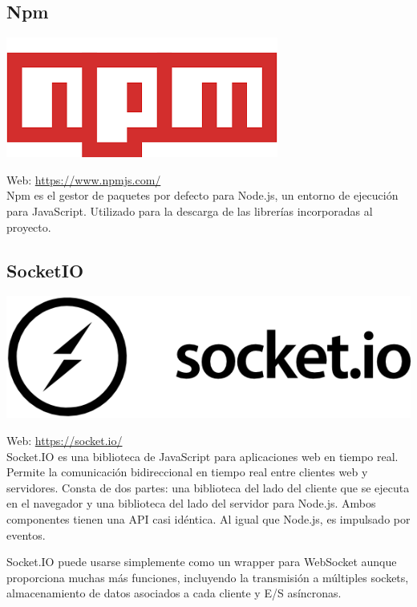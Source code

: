 \subsection{Npm}

\begin{center}
\includegraphics[scale=0.4]{imagenes/npm-logo.png}
\end{center}

Web: \url{https://www.npmjs.com/}\\

Npm es el gestor de paquetes por defecto para Node.js, un entorno de ejecución para JavaScript. Utilizado para la descarga de las librerías incorporadas al proyecto.


\subsection{SocketIO}

\begin{center}
\includegraphics[scale=0.3]{imagenes/socketio-logo.png}
\end{center}

Web: \url{https://socket.io/}\\

Socket.IO es una biblioteca de JavaScript para aplicaciones web en tiempo real. Permite la comunicación bidireccional en tiempo real entre clientes web y servidores. Consta de dos partes: una biblioteca del lado del cliente
que se ejecuta en el navegador y una biblioteca del lado del servidor para Node.js. Ambos componentes tienen una API casi idéntica. Al igual que Node.js, es impulsado por eventos.

Socket.IO puede usarse simplemente como un wrapper para WebSocket aunque proporciona muchas más funciones, incluyendo la transmisión a múltiples sockets, almacenamiento de datos asociados a cada cliente y E/S asíncronas.


